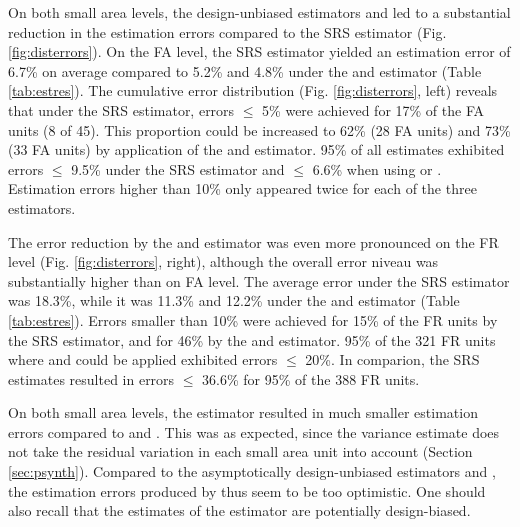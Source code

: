 On both small area levels, the design-unbiased estimators \psmall{} and \extpsynth{} led to a substantial reduction in the estimation errors compared to the SRS estimator (Fig. \ref{fig:disterrors}). On the FA level, the SRS estimator yielded an estimation error of 6.7\% on average compared to 5.2\% and 4.8\% under the \extpsynth{} and \psmall{} estimator (Table \ref{tab:estres}). The cumulative error distribution (Fig. \ref{fig:disterrors}, left) reveals that under the SRS estimator, errors $\leq$ 5\% were achieved for 17\% of the FA units (8 of 45). This proportion could be increased to 62\% (28 FA units) and 73\% (33 FA units) by application of the \psmall{} and \extpsynth{} estimator. 95\% of all estimates exhibited errors $\leq$ 9.5\% under the SRS estimator and $\leq$ 6.6\% when using \psmall{} or \extpsynth{}. Estimation errors higher than 10\% only appeared twice for each of the three estimators.\par
The error reduction by the \psmall{} and \extpsynth{} estimator was even more pronounced on the FR level (Fig. \ref{fig:disterrors}, right), although the overall error niveau was substantially higher than on FA level. The average error under the SRS estimator was 18.3\%, while it was 11.3\% and 12.2\% under the \psmall{} and \extpsynth{} estimator (Table \ref{tab:estres}). Errors smaller than 10\% were achieved for 15\% of the FR units by the SRS estimator, and for 46\% by the \psmall{} and \psynth{} estimator. 95\% of the 321 FR units where \psmall{} and \extpsynth{} could be applied exhibited errors $\leq$ 20\%. In comparion, the SRS estimates resulted in errors $\leq$ 36.6\% for 95\% of the 388 FR units.\par
On both small area levels, the \psynth{} estimator resulted in much smaller estimation errors compared to \psmall{} and \extpsynth{}. This was as expected, since the \psynth{} variance estimate does not take the residual variation in each small area unit into account (Section \ref{sec:psynth}). Compared to the asymptotically design-unbiased estimators \psmall{} and \extpsynth{}, the estimation errors produced by \psynth{} thus seem to be too optimistic. One should also recall that the estimates of the \psynth{} estimator are potentially design-biased.


